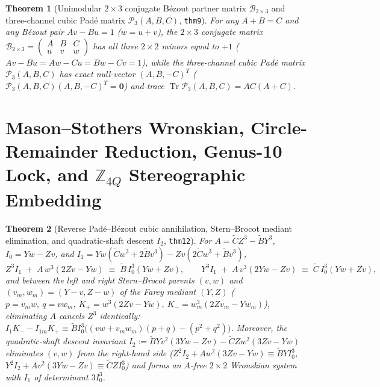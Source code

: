 \documentclass[11pt,a4paper]{article}
\theoremstyle{plain}
\newtheorem{theorem}{Theorem}[section]
\theoremstyle{definition}
\begin{document}
\begin{theorem}[Unimodular $2\times 3$ conjugate B\'ezout partner matrix $\mathcal{B}_{2\times 3}$ and three-channel cubic Pad\'e matrix $\mathcal{P}_3(A,B,C)$, \texttt{thm9}]
\label{thm:main-9}
For any $A + B = C$ and any B\'ezout pair $A v - B u = 1$ ($w = u + v$), the $2\times 3$ conjugate matrix $\mathcal{B}_{2\times 3} = \begin{pmatrix} A & B & C \\ u & v & w \end{pmatrix}$ has all three $2\times 2$ minors equal to $+1$ ($Av-Bu = Aw-Cu = Bw-Cv = 1$), while the three-channel cubic Pad\'e matrix $\mathcal{P}_3(A,B,C)$ has exact null-vector $(A,B,-C)^T$ ($\mathcal{P}_3(A,B,C)(A,B,-C)^T = \mathbf{0}$) and trace $\operatorname{Tr}\mathcal{P}_3(A,B,C) = A C(A+C)$.
\end{theorem}

\section{Mason--Stothers Wronskian, Circle-Remainder Reduction, Genus-10 Lock, and \texorpdfstring{$\mathbb{Z}_{4Q}$}{Z\_4Q} Stereographic Embedding}
\label{sec:universal-theorems}

\begin{theorem}[Reverse Pad\'e--B\'ezout cubic annihilation, Stern--Brocot mediant elimination, and quadratic-shaft descent $I_2$, \texttt{thm12}]
\label{thm:reverse-pade-thm12}
For $A = \widetilde{C}Z^3 - \widetilde{B}Y^3$, $I_0 = Yw - Zv$, and $I_1 = Yw(\widetilde{C}w^3+2\widetilde{B}v^3) - Zv(2\widetilde{C}w^3+\widetilde{B}v^3)$,
\begin{equation}
  \label{eq:reverse-pade-bezout}
  Z^3 I_1 \;+\; A\,w^3(2Zv - Yw) \;\equiv\; \widetilde{B}\,I_0^3(Yw + Zv),\qquad
  Y^3 I_1 \;+\; A\,v^3(2Yw - Zv) \;\equiv\; \widetilde{C}\,I_0^3(Yw + Zv),
\end{equation}
and between the left and right Stern--Brocot parents $(v,w)$ and $(v_m,w_m) = (Y-v,Z-w)$ of the Farey mediant $(Y,Z)$ ($p = v_m w,\ q = v w_m,\ K_+ = w^3(2Zv-Yw),\ K_- = w_m^3(2Zv_m-Yw_m)$), eliminating $A$ cancels $Z^3$ identically: $I_1 K_- - I_{1m} K_+ \equiv \widetilde{B} I_0^3\bigl((vw + v_m w_m)(p+q) - (p^2+q^2)\bigr)$. Moreover, the quadratic-shaft descent invariant $I_2 := \widetilde{B}Yv^2(3Yw-Zv) - \widetilde{C}Zw^2(3Zv-Yw)$ eliminates $(v,w)$ from the right-hand side ($Z^2 I_2 + A w^2(3Zv-Yw) \equiv \widetilde{B}Y I_0^3$, $Y^2 I_2 + A v^2(3Yw-Zv) \equiv \widetilde{C}Z I_0^3$) and forms an $A$-free $2\times 2$ Wronskian system with $I_1$ of determinant $3 I_0^3$.
\end{theorem}
\end{document}
